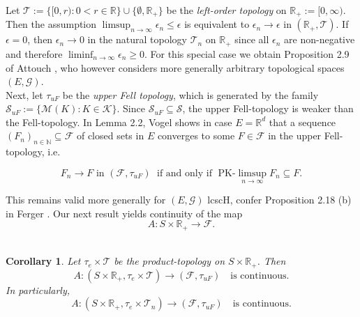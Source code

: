 \documentclass[sn-mathphys,Numbered]{sn-jnl}%
\theoremstyle{thmstyleone}%
\theoremstyle{thmstyletwo}%
\newtheorem{corollary}{Corollary}%
\theoremstyle{thmstylethree}%
\begin{document}
Let $\mathcal{T}:=\{[0,r): 0< r \in \mathbb{R}\} \cup \{\emptyset,\mathbb{R}_+\}$ be the \emph{left-order topology} on $\mathbb{R}_+:=[0,\infty)$. Then the assumption $\limsup_{n \rightarrow \infty} \epsilon_n \le \epsilon$ is
equivalent to $\epsilon_n \rightarrow \epsilon$ in $(\mathbb{R}_+,\mathcal{T})$. If $\epsilon=0$, then $\epsilon_n \rightarrow 0$ in the natural topology $\mathcal{T}_n$ on $\mathbb{R}_+$ since all $\epsilon_n$ are non-negative and therefore
$\liminf_{n \rightarrow \infty} \epsilon_n \ge 0$.
For this special case we obtain Proposition 2.9 of Attouch \cite{Attouch}, who however considers more generally arbitrary topological spaces $(E,\mathcal{G})$.\\

Next, let $\tau_{uF}$ be the \emph{upper Fell topology}, which is generated by the family $\mathcal{S}_{uF}:=\{\mathcal{M}(K): K \in \mathcal{K}\}$. Since $\mathcal{S}_{uF} \subseteq \mathcal{S}$, the upper Fell-topology is weaker
than the Fell-topology. In Lemma 2.2, Vogel \cite{Vogel} shows in case $E=\mathbb{R}^d$ that a sequence $(F_n)_{n \in \mathbb{N}} \subseteq \mathcal{F}$ of closed sets in $E$ converges to some $F \in \mathcal{F}$ in the
upper Fell-topology, i.e.

\begin{equation} \label{PKMiss}
 F_n \rightarrow F \text{ in } (\mathcal{F},\tau_{uF}) \; \text{ if and only if } \; \text{PK-}\limsup_{n \rightarrow \infty} F_n \subseteq F.
\end{equation}

This remains valid more generally for $(E,\mathcal{G})$ lcscH, confer Proposition 2.18 (b) in Ferger \cite{Ferger0}. Our next result yields continuity of the map $$A:S \times \mathbb{R}_+ \rightarrow \mathcal{F}.$$\\

\begin{corollary} \label{Aiscontinuous} Let $\tau_e \times \mathcal{T}$ be the product-topology on $S \times \mathbb{R}_+$. Then
\begin{equation} \label{leftordertopology}
A:(S \times \mathbb{R}_+,\tau_e \times \mathcal{T}) \rightarrow (\mathcal{F},\tau_{uF}) \quad \text{is continuous}.
\end{equation}
In particularly,
\begin{equation} \label{naturaltopology}
A:(S \times \mathbb{R}_+,\tau_e \times \mathcal{T}_n) \rightarrow (\mathcal{F},\tau_{uF}) \quad \text{is continuous}.
\end{equation}
\end{corollary}
\end{document}
